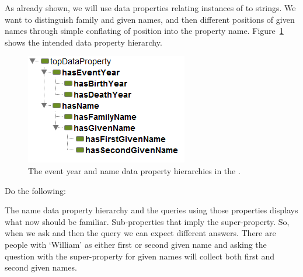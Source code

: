 As already shown, we will use data properties relating instances of \person to strings. We want to distinguish family and given names, and then different positions of given names through simple conflating of position into the property name. Figure~\ref{fig:data_hierarchy} shows the intended data property hierarchy.

\begin{figure}
\begin{center}
\includegraphics[width=\figwidth]{figures/new/event_name_hierarchy.PNG}\caption{The event year and name data property hierarchies in the \fhkb.}\label{fig:data_hierarchy}
\end{center}
\end{figure}

Do the following:

The name data property hierarchy and the queries using those properties displays what now should be familiar.
Sub-properties that imply the super-property. So, when we ask  and then the query  we can expect different answers. There are people with `William' as either first or second given name and asking the question with the super-property for given names will collect both first and second given names.

